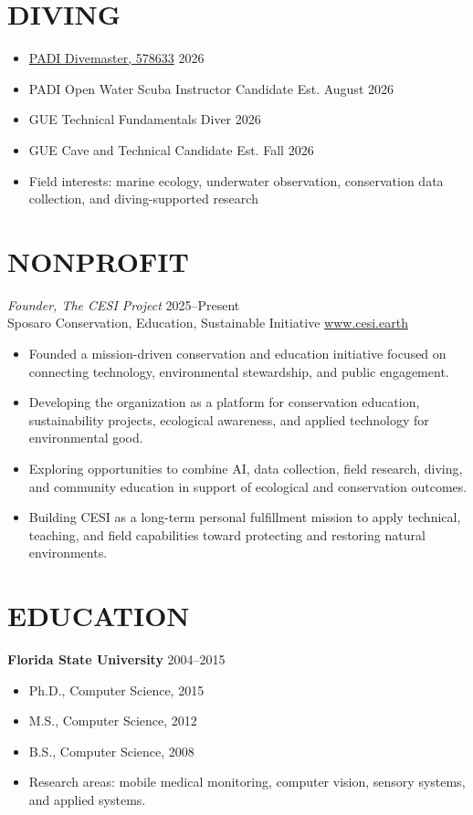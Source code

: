 \documentclass[margin]{res}
\begin{document}
\begin{resume}
\section{DIVING}
\begin{itemize}[itemsep=-2pt]
  \item \href{https://achievements.padi.com/48867df8-ea55-4676-a1b6-4cc2b80de2b0}{PADI Divemaster, 578633} \hfill 2026
  \item PADI Open Water Scuba Instructor Candidate \hfill Est. August 2026
  \item GUE Technical Fundamentals Diver \hfill 2026
  \item GUE Cave and Technical Candidate \hfill Est. Fall 2026
  \item Field interests: marine ecology, underwater observation, conservation data collection, and diving-supported research
\end{itemize}

\section{NONPROFIT}
{\sl Founder, The CESI Project} \hfill 2025--Present\\
Sposaro Conservation, Education, Sustainable Initiative \hfill \href{https://www.cesi.earth}{www.cesi.earth}
\begin{itemize}
\item Founded a mission-driven conservation and education initiative focused on connecting technology, environmental stewardship, and public engagement.
\item Developing the organization as a platform for conservation education, sustainability projects, ecological awareness, and applied technology for environmental good.
\item Exploring opportunities to combine AI, data collection, field research, diving, and community education in support of ecological and conservation outcomes.
\item Building CESI as a long-term personal fulfillment mission to apply technical, teaching, and field capabilities toward protecting and restoring natural environments.
\end{itemize}

\section{EDUCATION}
\textbf{Florida State University} \hfill 2004--2015
\begin{itemize}
\item Ph.D., Computer Science, 2015
\item M.S., Computer Science, 2012
\item B.S., Computer Science, 2008
\item Research areas: mobile medical monitoring, computer vision, sensory systems, and applied systems.
\end{itemize}


\end{resume}
\end{document}

